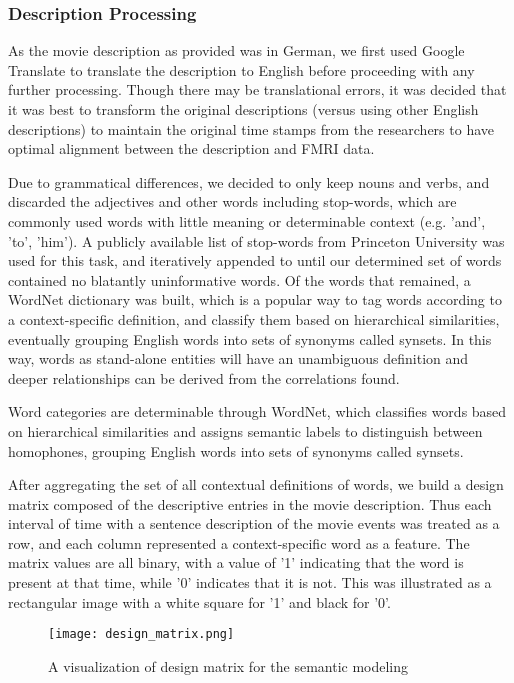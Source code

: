 \subsubsection{Description Processing}
\par As the movie description as provided was in German, we first used Google
Translate to translate the description to English before proceeding with 
any further processing. Though there may be translational errors, it was decided that it was best to transform the original descriptions (versus using other English descriptions) to maintain the original time stamps from the researchers to have optimal alignment between the description and FMRI data.

\par Due to grammatical differences, we decided to only keep nouns and verbs, and discarded the adjectives and other words including stop-words, which are commonly used words with little meaning or determinable context (e.g. 'and', 'to', 'him'). A publicly available list of stop-words from Princeton University was used for this task, and iteratively appended to until our determined set of words contained no blatantly uninformative words. Of the words that remained, a WordNet dictionary was built, which is a popular way to tag words according to a context-specific definition, and classify them based on hierarchical similarities, eventually grouping English words into sets of synonyms called synsets. In this way, words as stand-alone entities will have an unambiguous definition and deeper relationships can be derived from the correlations found. 

 \par Word categories are determinable through WordNet, which classifies words based on hierarchical similarities and assigns semantic labels to distinguish between homophones, grouping English words into sets of synonyms called synsets.  
 \par After aggregating the set of all contextual definitions of words,
 we build a design matrix composed of the descriptive entries in the movie description. Thus each interval of time with a sentence description of the movie events was treated as a row, and each column represented a context-specific word as a feature. The matrix values are all binary, with a value of '1' indicating that the word is present at that time, while '0' indicates that it is not. This was illustrated as a rectangular image with a white square for '1' and black for '0'. 

\begin{figure}[!htbp]
\centering
\texttt{[image: design\_matrix.png]}
\caption{\label{fig:design_matrix} A visualization of design matrix for the semantic modeling}
\end{figure}

